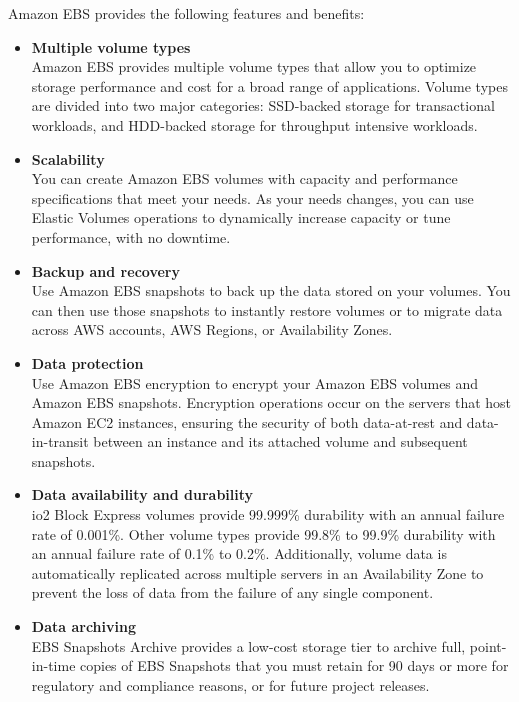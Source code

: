 \documentclass[12pt, letterpaper, twoside]{article}
\begin{document}
Amazon EBS provides the following features and benefits:

\begin{itemize}
	\item \textbf{Multiple volume types}\\
		 Amazon EBS provides multiple volume types that allow you to optimize storage performance and cost for a broad range of 
		 applications. Volume types are divided into two major categories: SSD-backed storage for transactional workloads, and 
		 HDD-backed storage for throughput intensive workloads.
	\item \textbf{Scalability}\\
		You can create Amazon EBS volumes with capacity and performance specifications that meet your needs. As your needs changes, 
		you can use Elastic Volumes operations to dynamically increase capacity or tune performance, with no downtime.
	\item \textbf{Backup and recovery}\\
		 Use Amazon EBS snapshots to back up the data stored on your volumes. You can then use those snapshots to instantly restore 
		 volumes or to migrate data across AWS accounts, AWS Regions, or Availability Zones.
	\item \textbf{Data protection}\\
		Use Amazon EBS encryption to encrypt your Amazon EBS volumes and Amazon EBS snapshots. Encryption operations occur on the 
		servers that host Amazon EC2 instances, ensuring the security of both data-at-rest and data-in-transit between an instance 
		and its attached volume and subsequent snapshots.
	\item \textbf{Data availability and durability}\\
		io2 Block Express volumes provide 99.999\% durability with an annual failure rate of 0.001\%. Other volume types provide 99.8\%
		to 99.9\% durability with an annual failure rate of 0.1\% to 0.2\%. Additionally, volume data is automatically replicated across 
		multiple servers in an Availability Zone to prevent the loss of data from the failure of any single component.
	\item \textbf{Data archiving}\\
		EBS Snapshots Archive provides a low-cost storage tier to archive full, point-in-time copies of EBS Snapshots that you must 
		retain for 90 days or more for regulatory and compliance reasons, or for future project releases.
\end{itemize}
\end{document}
